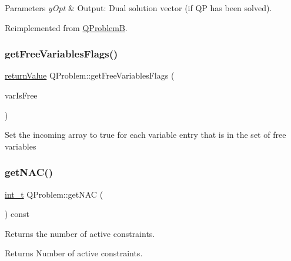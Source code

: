\begin{DoxyParams}{Parameters}
{\em y\+Opt} & Output\+: Dual solution vector (if QP has been solved). \\
\hline
\end{DoxyParams}


Reimplemented from \hyperlink{class_q_problem_b_aed886c847f0f18259726d758e7d24abe}{Q\+ProblemB}.

\mbox{\label{class_q_problem_a08dc923d7c2b0bffd33fbab63688d3a7}} 
\subsubsection{\texorpdfstring{get\+Free\+Variables\+Flags()}{getFreeVariablesFlags()}}
{\footnotesize\ttfamily \hyperlink{_message_handling_8hpp_a81d556f613bfbabd0b1f9488c0fa865e}{return\+Value} Q\+Problem\+::get\+Free\+Variables\+Flags (\begin{DoxyParamCaption}\item[{\hyperlink{_types_8hpp_a20f82124c82b6f5686a7fce454ef9089}{Boolean\+Type} $\ast$}]{var\+Is\+Free }\end{DoxyParamCaption})}

Set the incoming array to true for each variable entry that is in the set of free variables \mbox{\label{class_q_problem_a0c7a881779dd2b8fa645b184f1993209}} 
\subsubsection{\texorpdfstring{get\+N\+A\+C()}{getNAC()}}
{\footnotesize\ttfamily \hyperlink{_types_8hpp_ab6fd6105e64ed14a0c9281326f05e623}{int\+\_\+t} Q\+Problem\+::get\+N\+AC (\begin{DoxyParamCaption}{ }\end{DoxyParamCaption}) const\hspace{0.3cm}{\ttfamily [inline]}}

Returns the number of active constraints. \begin{DoxyReturn}{Returns}
Number of active constraints. 
\end{DoxyReturn}
\mbox{\label{class_q_problem_aaf9795d583672369b886e9deb683b506}} 
